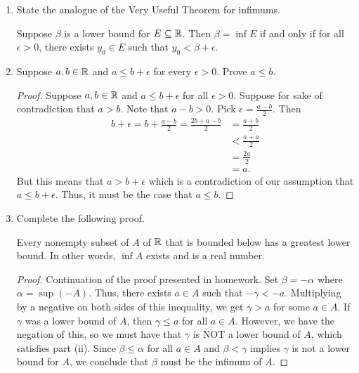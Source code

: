 \documentclass[11pt,a4paper]{article}
\begin{document}
\begin{enumerate}
 \item State the analogue of the Very Useful Theorem for infimums. \label{Problem 3}
     \begin{solution}
        Suppose \( \beta  \) is a lower bound for \( E \subseteq \mathbb{R}    \). Then \( \beta = \inf E  \) if and only if for all \( \epsilon > 0  \), there exists \( {y}_{0} \in E  \) such that \( {y}_{0} < \beta + \epsilon  \).
        \end{solution}
    \item Suppose \( a,b \in \mathbb{R}  \) and \( a \leq b + \epsilon  \) for every \( \epsilon > 0  \). Prove \( a \leq b  \). \label{Problem 5}
        \begin{proof}
        Suppose \( a, b \in \mathbb{R}  \) and \( a \leq b + \epsilon  \) for all \( \epsilon > 0  \). Suppose for sake of contradiction that \(  a > b  \). Note that \( a - b > 0   \). Pick \( \epsilon  = \frac{  a - b  }{  2  }  \). Then 
        \begin{align*}
            b  + \epsilon = b + \frac{ a - b  }{ 2 } = \frac{  2b + a - b }{ 2  }     
                                                     &= \frac{ a  +b  }{ 2  } \\ 
                                                     &< \frac{ a + a  }{ 2  } \\
                                                     &= \frac{ 2 a  }{  2  } \\
                                                     &= a.
        \end{align*}
        But this means that \( a > b + \epsilon  \) which is a contradiction of our assumption that \( a \leq b + \epsilon  \). Thus, it must be the case that \( a \leq b  \).
    \end{proof}
    \item Complete the following proof.   
\begin{theorem}
   Every nonempty subset of \( A  \) of \( \mathbb{R}  \) that is bounded below has a greatest lower bound. In other words, \( \inf A  \) exists and is a real number.   
\end{theorem}
\begin{proof}
Continuation of the proof presented in homework. Set \( \beta = - \alpha  \) where \(  \alpha  = \sup (-A )   \). Thus, there exists \( a \in A  \) such that \( - \gamma < - a  \). Multiplying by a negative on both sides of this inequality, we get \(  \gamma > a  \) for some \( a \in A  \). If \( \gamma  \) was a lower bound of \( A  \), then \( \gamma \leq a   \) for all \( a \in A  \). However, we have the negation of this, so we must have that \( \gamma  \) is NOT a lower bound of \( A  \), which satisfies part (ii). Since \( \beta \leq \alpha  \) for all \( a \in A  \) and \( \beta < \gamma  \) implies \( \gamma  \) is not a lower bound for \( A  \), we conclude that \( \beta  \) must be the infimum of \( A  \).  

\end{proof}
\end{enumerate}
\end{document}
